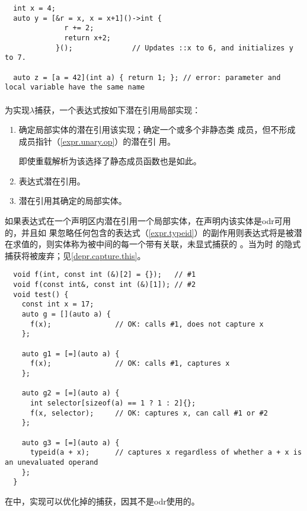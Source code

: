 \begin{example}
  \begin{lstlisting}
  int x = 4;
  auto y = [&r = x, x = x+1]()->int {
              r += 2;
              return x+2;
            }();              // Updates ::x to 6, and initializes y to 7.

  auto z = [a = 42](int a) { return 1; }; // error: parameter and local variable have the same name
  \end{lstlisting}
\end{example}

\paragraph{} %
为实现$\lambda$捕获，一个表达式按如下潜在引用局部实现：
\begin{enumerate}
  \item 确定局部实体的潜在引用该实现；确定一个或多个非静态类
        成员，但不形成成员指针（\ref{expr.unary.op}）的潜在引
        用。
        \begin{note}
          即使重载解析为该选择了静态成员函数也是如此。
        \end{note}
  \item {}表达式潜在引用。
  \item {}潜在引用其确定的局部实体。
\end{enumerate}
如果表达式在一个声明区内潜在引用一个局部实体，在声明内该实体是odr可用的，并且如
果忽略任何包含的表达式（\ref{expr.typeid}）的副作用则表达式将是被潜
在求值的，则实体称为被中间的每一个带有关联，未显式捕获的
。当为\tm{=}时
的隐式捕获将被废弃；见\ref{depr.capture.this}。

\begin{example}
  \begin{lstlisting}
  void f(int, const int (&)[2] = {});   // #1
  void f(const int&, const int (&)[1]); // #2
  void test() {
    const int x = 17;
    auto g = [](auto a) {
      f(x);               // OK: calls #1, does not capture x
    };

    auto g1 = [=](auto a) {
      f(x);               // OK: calls #1, captures x
    };

    auto g2 = [=](auto a) {
      int selector[sizeof(a) == 1 ? 1 : 2]{};
      f(x, selector);     // OK: captures x, can call #1 or #2
    };

    auto g3 = [=](auto a) {
      typeid(a + x);      // captures x regardless of whether a + x is an unevaluated operand
    };
  }
  \end{lstlisting}
在中，实现可以优化掉的捕获，因其不是odr使用的。
\end{example}

